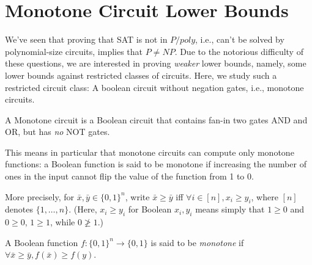 %
%
%





\chapter{Monotone Circuit Lower Bounds}
\label{sec:Razborov} %



We've seen that proving that SAT is not in $P/poly$, i.e., can't be solved by polynomial-size circuits, implies that $P \neq NP$.
Due to the notorious difficulty of these questions, we are interested in proving \emph{weaker} lower bounds, namely, some lower bounds against restricted classes of circuits. 
Here, we study such a restricted circuit class: A boolean circuit without negation gates, i.e., monotone circuits.

\begin{definition}
A Monotone circuit is a Boolean circuit that contains fan-in two gates AND and OR, but has \emph{no} NOT gates.
\end{definition}

This means in particular that monotone circuits can compute only monotone functions: a Boolean function is said to be monotone if increasing the number of ones in the input cannot flip the value of the function from 1 to 0. 

More precisely, for $\bar{x}, \bar{y} \in\{0,1\}^n$, write $\bar{x} \geqslant \bar{y}$ iff $ \forall i \in [n], x_i \geqslant y_i$, where $[n]$ denotes $\{1,\dots,n\}$. (Here, $x_i\ge y_i$ for Boolean $x_i,y_i$ means simply that $1\ge 0$ and $0\ge 0$, $1\ge 1$, while $0\not\ge 1$.)

\begin{definition}
A Boolean function $f:\{0,1\}^n \rightarrow\{0,1\}$ is said to be  \emph{monotone} if $\forall \bar{x} \geq \bar{y}, f(\bar{x}) \geqslant f(y)$.
\end{definition}


